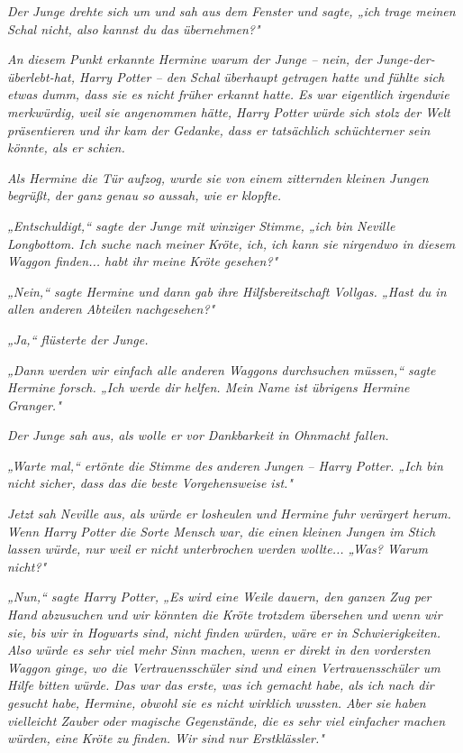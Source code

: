 {\emph{Der Junge drehte sich um und sah aus dem Fenster und sagte, „ich trage meinen Schal nicht, also kannst du das übernehmen?"}

\emph{An diesem Punkt erkannte Hermine warum der Junge -- nein, der Junge-der-überlebt-hat, Harry Potter -- den Schal überhaupt getragen hatte und fühlte sich etwas dumm, dass sie es nicht früher erkannt hatte. Es war eigentlich irgendwie merkwürdig, weil sie angenommen hätte, Harry Potter würde sich stolz der Welt präsentieren und ihr kam der Gedanke, dass er tatsächlich schüchterner sein könnte, als er schien.}

\emph{Als Hermine die Tür aufzog, wurde sie von einem zitternden kleinen Jungen begrüßt, der ganz genau so aussah, wie er klopfte.}

\emph{„Entschuldigt,“ sagte der Junge mit winziger Stimme, „ich bin Neville Longbottom. Ich suche nach meiner Kröte, ich, ich kann sie nirgendwo in diesem Waggon finden... habt ihr meine Kröte gesehen?"}

\emph{„Nein,“ sagte Hermine und dann gab ihre Hilfsbereitschaft Vollgas. „Hast du in allen anderen Abteilen nachgesehen?"}

\emph{„Ja,“ flüsterte der Junge.}

\emph{„Dann werden wir einfach alle anderen Waggons durchsuchen müssen,“ sagte Hermine forsch. „Ich werde dir helfen. Mein Name ist übrigens Hermine Granger."}

\emph{Der Junge sah aus, als wolle er vor Dankbarkeit in Ohnmacht fallen.}

\emph{„Warte mal,“ ertönte die Stimme des} \emph{\emph{anderen}} \emph{Jungen -- Harry Potter. „Ich bin nicht sicher, dass das die beste Vorgehensweise ist."}

\emph{Jetzt sah Neville aus, als würde er losheulen und Hermine fuhr verärgert herum. Wenn Harry Potter die} \emph{Sorte Mensch} \emph{war, die einen kleinen Jungen im Stich lassen würde, nur weil er nicht unterbrochen werden wollte... „Was? Warum} \emph{\emph{nicht?}"}

\emph{„Nun,“ sagte Harry Potter, „Es wird eine Weile dauern, den ganzen Zug per Hand abzusuchen und wir könnten die Kröte trotzdem übersehen und wenn wir sie, bis wir in Hogwarts sind, nicht finden würden, wäre er in Schwierigkeiten. Also würde es sehr viel mehr Sinn machen, wenn er direkt in den vordersten Waggon ginge, wo die Vertrauensschüler sind und einen Vertrauensschüler um Hilfe bitten würde. Das war das erste, was ich gemacht habe, als ich nach dir gesucht habe, Hermine, obwohl sie es nicht wirklich wussten. Aber sie haben vielleicht Zauber oder magische Gegenstände, die es sehr viel einfacher machen würden, eine Kröte zu finden. Wir sind nur Erstklässler."}

}

